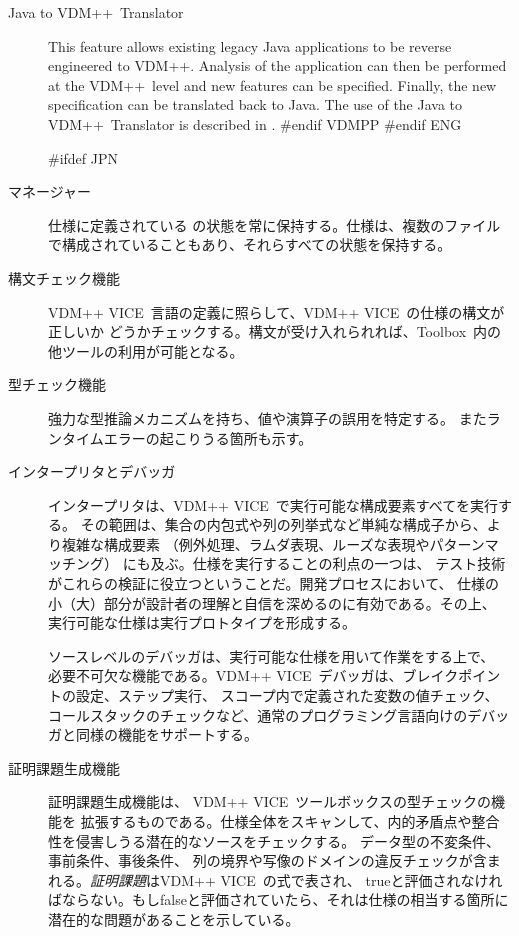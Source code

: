 \documentclass[\pformat,12pt]{article}
\def\vdmpp{{\small VDM}++}
\newcommand{\vdmslpp}{VDM-SL}
\newcommand{\Toolbox}{Toolbox}
\newcommand{\vdmslpp}{VDM++}
\newcommand{\Toolbox}{Toolbox}
\renewcommand{\vdmslpp}{VDM++ VICE}
\begin{document}
\begin{description}
\item[Java to \vdmpp\ Translator] This feature allows existing legacy Java
  applications to be reverse engineered to \vdmpp. Analysis of the
  application can then be performed at the \vdmpp\ level and new
  features can be specified. Finally, the new specification can be
  translated back to Java. The use of the Java to \vdmpp\ Translator
  is described in \cite{Java2VDMMan-SCSK}.
#endif VDMPP
#endif ENG

#ifdef JPN
\item[マネージャー] 仕様に定義されている
の状態を常に保持する。仕様は、複数のファイルで構成されていることもあり、それらすべての状態を保持する。

\item[構文チェック機能] \vdmslpp\ 言語の定義に照らして、\vdmslpp\ の仕様の構文が正しいか
どうかチェックする。構文が受け入れられれば、\Toolbox\ 内の他ツールの利用が可能となる。

\item[型チェック機能] 強力な型推論メカニズムを持ち、値や演算子の誤用を特定する。
またランタイムエラーの起こりうる箇所も示す。

\item[インタープリタとデバッガ] インタープリタは、\vdmslpp\ で実行可能な構成要素すべてを実行する。
その範囲は、集合の内包式や列の列挙式など単純な構成子から、より複雑な構成要素
（例外処理、ラムダ表現、ルーズな表現やパターンマッチング）
にも及ぶ。仕様を実行することの利点の一つは、
テスト技術がこれらの検証に役立つということだ。開発プロセスにおいて、
仕様の小（大）部分が設計者の理解と自信を深めるのに有効である。その上、
実行可能な仕様は実行プロトタイプを形成する。

ソースレベルのデバッガは、実行可能な仕様を用いて作業をする上で、
必要不可欠な機能である。\vdmslpp\ デバッガは、ブレイクポイントの設定、ステップ実行、
スコープ内で定義された変数の値チェック、
コールスタックのチェックなど、通常のプログラミング言語向けのデバッガと同様の機能をサポートする。

\item[証明課題生成機能] 証明課題生成機能は、 \vdmslpp\ ツールボックスの型チェックの機能を
拡張するものである。仕様全体をスキャンして、内的矛盾点や整合性を侵害しうる潜在的なソースをチェックする。
データ型の不変条件、事前条件、事後条件、
列の境界や写像のドメインの違反チェックが含まれる。\emph{証明課題}は\vdmslpp\ の式で表され、
trueと評価されなければならない。もしfalseと評価されていたら、それは仕様の相当する箇所に
潜在的な問題があることを示している。


\end{description}
\end{document}
